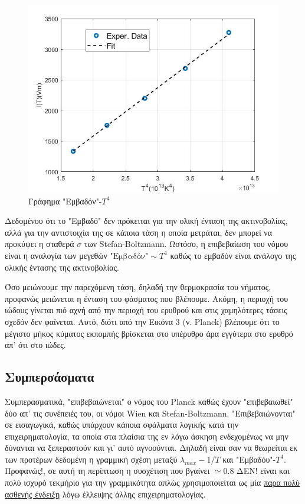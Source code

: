 \documentclass[a4paper]{article}
\begin{document}
\begin{figure}[h!]
\centering 
\caption{ Γράφημα "Εμβαδόν"-$T^4$}
\includegraphics[scale=0.6]{stefan_exper.jpg}

\end{figure}

Δεδομένου ότι το "Εμβαδό" δεν πρόκειται για την ολική ένταση της ακτινοβολίας, αλλά για την αντιστοιχία της σε κάποια τάση η οποία μετράται, δεν μπορεί να προκύψει η σταθερά $\sigma$ των  Stefan-Boltzmann.
 Ωστόσο, η επιβεβαίωση του νόμου είναι η αναλογία των μεγεθών $\text{"Εμβαδόν"}\sim T^4$ καθώς το εμβαδόν είναι ανάλογο της ολικής έντασης της ακτινοβολίας.


Όσο μειώνουμε την παρεχόμενη τάση, δηλαδή την θερμοκρασία του νήματος, προφανώς μειώνεται η ένταση του φάσματος που βλέπουμε. Ακόμη, η περιοχή του ιώδους γίνεται πιό αχνή από την περιοχή του ερυθρού και στις χαμηλότερες τάσεις σχεδόν δεν φαίνεται. Αυτό, διότι από την Εικόνα 3 (ν. Planck) βλέπουμε ότι το μέγιστο μήκος κύματος εκπομπής βρίσκεται στο υπέρυθρο άρα εγγύτερα στο ερυθρό απ' ότι στο ιώδες.




\subsection*{Συμπερσάσματα}
Συμπερασματικά, "επιβεβαιώνεται" ο νόμος του Planck καθώς έχουν "επιβεβαιωθεί" δύο απ' τις συνέπειές του, οι νόμοι Wien και Stefan-Boltzmann. "Επιβεβαιώνονται" σε εισαγωγικά, καθώς υπάρχουν κάποια σφάλματα λογικής κατά την επιχειρηματολογία, τα οποία στα πλαίσια της εν λόγω άσκηση ενδεχομένως να μην δύνανται να ξεπεραστούν και γι' αυτό αγνοούνται. Δηλαδή είναι σαν να θεωρείται εκ των προτέρων δεδομένη η γραμμική σχέση μεταξύ $\lambda_{max}-1/T$ και "Εμβαδόυ"-$T^4$. Προφανώς!, σε αυτή τη περίπτωση η συσχέτιση που βγαίνει $\simeq0.8$ ΔΕΝ! είναι και πολύ ισχυρό τεκμήριο για την γραμμικότητα απλώς χρησιμοποιείται ως μία \underline{παρα πολύ ασθενής ένδειξη} λόγω έλλειψης άλλης επιχειρηματολογίας.
\end{document}
